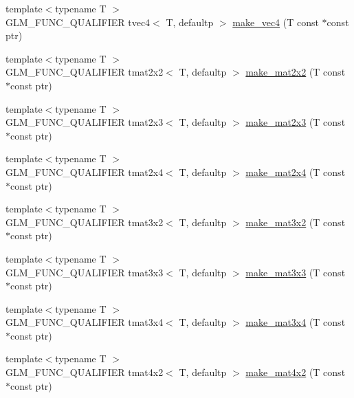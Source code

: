 \begin{DoxyCompactItemize}
\item 
{\footnotesize template$<$typename T $>$ }\\G\+L\+M\+\_\+\+F\+U\+N\+C\+\_\+\+Q\+U\+A\+L\+I\+F\+I\+E\+R tvec4$<$ T, defaultp $>$ \hyperlink{group__gtc__type__ptr_ga152345176b8951c15711f6ed4f6fc237}{make\+\_\+vec4} (T const $\ast$const ptr)
\item 
{\footnotesize template$<$typename T $>$ }\\G\+L\+M\+\_\+\+F\+U\+N\+C\+\_\+\+Q\+U\+A\+L\+I\+F\+I\+E\+R tmat2x2$<$ T, defaultp $>$ \hyperlink{group__gtc__type__ptr_gadb29e510762e1042069cb28bf24ae990}{make\+\_\+mat2x2} (T const $\ast$const ptr)
\item 
{\footnotesize template$<$typename T $>$ }\\G\+L\+M\+\_\+\+F\+U\+N\+C\+\_\+\+Q\+U\+A\+L\+I\+F\+I\+E\+R tmat2x3$<$ T, defaultp $>$ \hyperlink{group__gtc__type__ptr_ga37988c6dd941f617cdfab86d54375fc1}{make\+\_\+mat2x3} (T const $\ast$const ptr)
\item 
{\footnotesize template$<$typename T $>$ }\\G\+L\+M\+\_\+\+F\+U\+N\+C\+\_\+\+Q\+U\+A\+L\+I\+F\+I\+E\+R tmat2x4$<$ T, defaultp $>$ \hyperlink{group__gtc__type__ptr_ga6dfb2ac10859b0cc8e3893ea84fa95b5}{make\+\_\+mat2x4} (T const $\ast$const ptr)
\item 
{\footnotesize template$<$typename T $>$ }\\G\+L\+M\+\_\+\+F\+U\+N\+C\+\_\+\+Q\+U\+A\+L\+I\+F\+I\+E\+R tmat3x2$<$ T, defaultp $>$ \hyperlink{group__gtc__type__ptr_gabe1e5066608a66da7a94f802b57b4eed}{make\+\_\+mat3x2} (T const $\ast$const ptr)
\item 
{\footnotesize template$<$typename T $>$ }\\G\+L\+M\+\_\+\+F\+U\+N\+C\+\_\+\+Q\+U\+A\+L\+I\+F\+I\+E\+R tmat3x3$<$ T, defaultp $>$ \hyperlink{group__gtc__type__ptr_ga3cbe7adf857c867cee77eae4617abadd}{make\+\_\+mat3x3} (T const $\ast$const ptr)
\item 
{\footnotesize template$<$typename T $>$ }\\G\+L\+M\+\_\+\+F\+U\+N\+C\+\_\+\+Q\+U\+A\+L\+I\+F\+I\+E\+R tmat3x4$<$ T, defaultp $>$ \hyperlink{group__gtc__type__ptr_gac083edd180ab4d4b817acc60c516209b}{make\+\_\+mat3x4} (T const $\ast$const ptr)
\item 
{\footnotesize template$<$typename T $>$ }\\G\+L\+M\+\_\+\+F\+U\+N\+C\+\_\+\+Q\+U\+A\+L\+I\+F\+I\+E\+R tmat4x2$<$ T, defaultp $>$ \hyperlink{group__gtc__type__ptr_ga967a5b934e67ff9a6d1d0d27a377a264}{make\+\_\+mat4x2} (T const $\ast$const ptr)

\end{DoxyCompactItemize}
